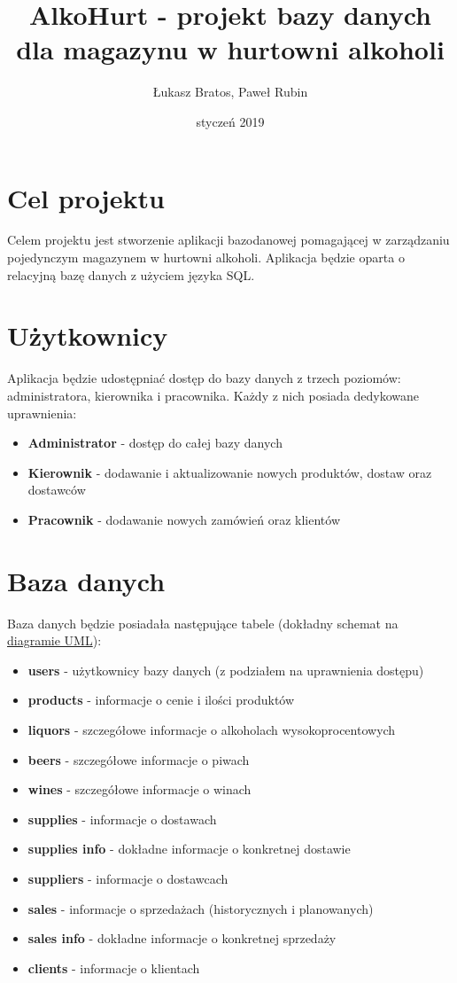 \documentclass[12pt,a4paper]{article}
\author{Łukasz Bratos, Paweł Rubin}
\title{AlkoHurt - projekt bazy danych dla magazynu w hurtowni alkoholi}
\date{styczeń 2019}
\begin{document}
\maketitle

\section*{Cel projektu}

    Celem projektu jest stworzenie aplikacji bazodanowej pomagającej w zarządzaniu pojedynczym magazynem w hurtowni alkoholi. Aplikacja będzie oparta o relacyjną bazę danych z użyciem języka SQL.
    
\section*{Użytkownicy}
    
    Aplikacja będzie udostępniać dostęp do bazy danych z trzech poziomów: administratora, kierownika i pracownika. Każdy z nich posiada dedykowane uprawnienia:
    \begin{itemize}
        \item \textbf{Administrator} - dostęp do całej bazy danych
        \item \textbf{Kierownik} - dodawanie i aktualizowanie nowych produktów, dostaw oraz dostawców
        \item \textbf{Pracownik} - dodawanie nowych zamówień oraz klientów
    \end{itemize}
    
\section*{Baza danych}

    Baza danych będzie posiadała następujące tabele (dokładny schemat na  \hyperref[fig:diagram]{diagramie UML}):
    
    \begin{itemize}
        \item \textbf{users} - użytkownicy bazy danych (z podziałem na uprawnienia dostępu)
        \item \textbf{products} - informacje o cenie i ilości produktów
        \item \textbf{liquors} - szczegółowe informacje o alkoholach wysokoprocentowych
        \item \textbf{beers} - szczegółowe informacje o piwach
        \item \textbf{wines} - szczegółowe informacje o winach
        \item \textbf{supplies} - informacje o dostawach
        \item \textbf{supplies info} - dokładne informacje o konkretnej dostawie
        \item \textbf{suppliers} - informacje o dostawcach
        \item \textbf{sales} - informacje o sprzedażach (historycznych i planowanych)
        \item \textbf{sales info} - dokładne informacje o konkretnej sprzedaży
        \item \textbf{clients} - informacje o klientach
    \end{itemize}
    
\end{document}
